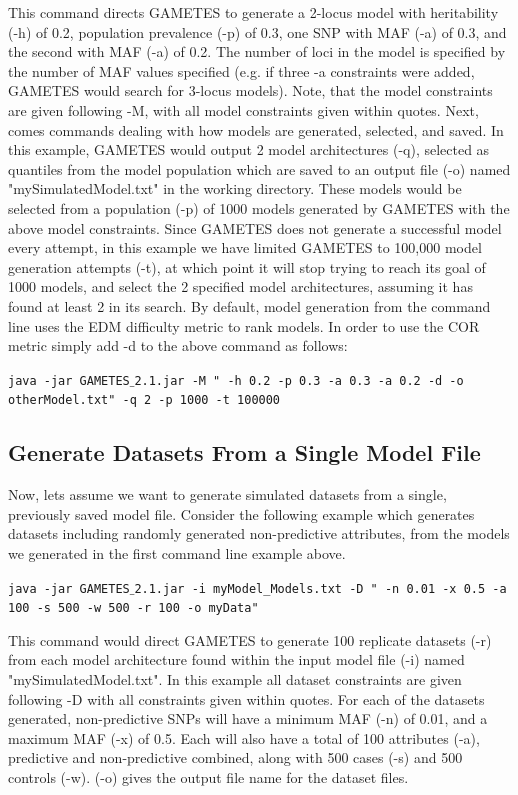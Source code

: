 \documentclass{report}
\begin{document}
This command directs GAMETES to generate a 2-locus model with heritability (-h) of 0.2, population prevalence (-p) of 0.3, one SNP with MAF (-a) of 0.3, and the second with MAF (-a) of 0.2.  The number of loci in the model is specified by the number of MAF values specified (e.g. if three -a constraints were added, GAMETES would search for 3-locus models).  Note, that the model constraints are given following -M, with all model constraints given within quotes. Next, comes commands dealing with how models are generated, selected, and saved.  In this example, GAMETES would output 2 model architectures (-q), selected as quantiles from the model population which are saved to an output file (-o) named "mySimulatedModel.txt" in the working directory.  These models would be selected from a population (-p) of 1000 models generated by GAMETES with the above model constraints.  Since GAMETES does not generate a successful model every attempt, in this example we have limited GAMETES to 100,000 model generation attempts (-t), at which point it will stop trying to reach its goal of 1000 models, and select the 2 specified model architectures, assuming it has found at least 2 in its search. By default, model generation from the command line uses the EDM difficulty metric to rank models.  In order to use the COR metric simply add -d to the above command as follows:

\begin{center}
\texttt{java -jar GAMETES$\_$2.1.jar -M " -h 0.2 -p 0.3 -a 0.3 -a 0.2 -d -o otherModel.txt" -q 2 -p 1000 -t 100000}
\end{center}

\subsection{Generate Datasets From a Single Model File}
Now, lets assume we want to generate simulated datasets from a single, previously saved model file.  Consider the following example which generates datasets including randomly generated non-predictive attributes, from the models we generated in the first command line example above.

\begin{center}
\texttt{java -jar GAMETES$\_$2.1.jar -i myModel\_Models.txt -D " -n 0.01 -x 0.5 -a 100 -s 500 -w 500 -r 100 -o myData"}
\end{center}

This command would direct GAMETES to generate 100 replicate datasets (-r) from each model architecture found within the input model file (-i) named "mySimulatedModel.txt".   In this example all dataset constraints are given following -D with all constraints given within quotes.  For each of the datasets generated, non-predictive SNPs will have a minimum MAF (-n) of 0.01, and a maximum MAF (-x) of 0.5.  Each will also have a total of 100 attributes (-a), predictive and non-predictive combined, along with 500 cases (-s) and 500 controls (-w).  (-o) gives the output file name for the dataset files.
\end{document}
